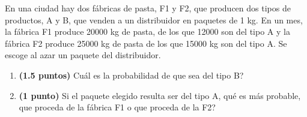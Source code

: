 
En una ciudad hay dos fábricas de pasta, F1 y F2, que producen dos tipos de productos, A y B, que venden a un distribuidor en paquetes de 1 kg. En un mes, la fábrica F1 produce 20000 kg de pasta, de los que 12000 son del tipo A y la fábrica F2 produce 25000 kg de pasta de los que 15000 kg son del tipo A. Se escoge al azar un paquete del distribuidor.
\begin{enumerate}[label=\alph*)]
\item \textbf{(1.5 puntos)} \textquestiondown{}Cuál es la probabilidad de que sea del tipo B?
\item \textbf{(1 punto)} Si el paquete elegido resulta ser del tipo A, \textquestiondown{}qué es más probable, que proceda de la fábrica F1 o que proceda de la F2?
\end{enumerate}
